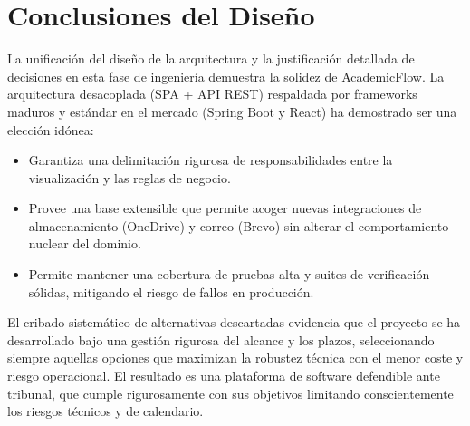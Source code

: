 \FloatBarrier
\section{Conclusiones del Dise\~no}

La unificaci\'on del dise\~no de la arquitectura y la justificaci\'on detallada de decisiones en esta fase de ingenier\'ia demuestra la solidez de AcademicFlow. La arquitectura desacoplada (SPA + API REST) respaldada por frameworks maduros y est\'andar en el mercado (Spring Boot y React) ha demostrado ser una elecci\'on id\'onea:
\begin{itemize}
    \item Garantiza una delimitaci\'on rigurosa de responsabilidades entre la visualizaci\'on y las reglas de negocio.
    \item Provee una base extensible que permite acoger nuevas integraciones de almacenamiento (OneDrive) y correo (Brevo) sin alterar el comportamiento nuclear del dominio.
    \item Permite mantener una cobertura de pruebas alta y suites de verificaci\'on s\'olidas, mitigando el riesgo de fallos en producci\'on.
\end{itemize}

El cribado sistem\'atico de alternativas descartadas evidencia que el proyecto se ha desarrollado bajo una gesti\'on rigurosa del alcance y los plazos, seleccionando siempre aquellas opciones que maximizan la robustez t\'ecnica con el menor coste y riesgo operacional. El resultado es una plataforma de software defendible ante tribunal, que cumple rigurosamente con sus objetivos limitando conscientemente los riesgos t\'ecnicos y de calendario.

\FloatBarrier
